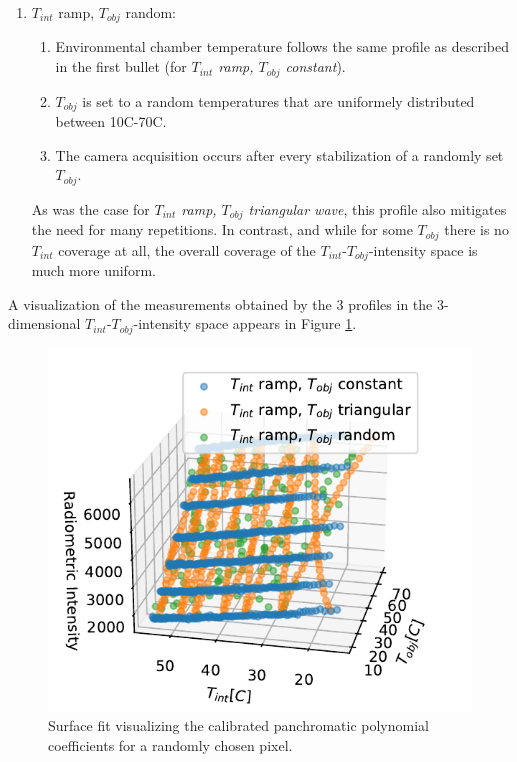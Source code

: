 \begin{enumerate}
  \item $T_\mathit{int}$ ramp, $T_\mathit{obj}$ random:
  \begin{enumerate}
    \item Environmental chamber temperature follows the same profile as described in the first bullet (for \emph{$T_\mathit{int}$ ramp, $T_\mathit{obj}$ constant}).
    \item $T_\mathit{obj}$ is set to a random temperatures that are uniformely distributed between 10C\textdegree-70C\textdegree.
    \item The camera acquisition occurs after every stabilization of a randomly set $T_\mathit{obj}$.
  \end{enumerate}
  As was the case for \emph{$T_\mathit{int}$ ramp, $T_\mathit{obj}$ triangular wave}, this profile also mitigates the need for many repetitions.
  In contrast, and while for some $T_\mathit{obj}$ there is no $T_\mathit{int}$ coverage at all, the overall coverage of the $T_\mathit{int}$-$T_\mathit{obj}$-intensity space is much more uniform.
\end{enumerate}
A visualization of the measurements obtained by the 3 profiles in the 3-dimensional $T_\mathit{int}$-$T_\mathit{obj}$-intensity space appears in Figure \ref{fig:measrement_approaches}.
\begin{figure}[H]
  \centering
  \includegraphics[width=0.7\linewidth]{../figs/methods/measurement_approaches.pdf}
  \caption{Surface fit visualizing the calibrated panchromatic polynomial coefficients for a randomly chosen pixel.}
  \label{fig:measrement_approaches}
\end{figure}

